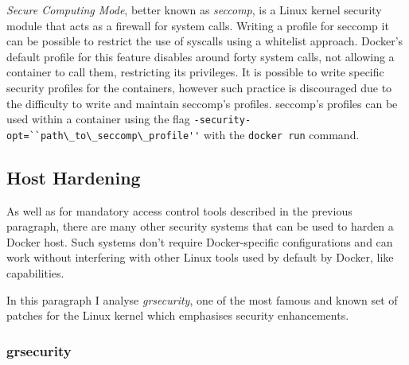 \documentclass[a4paper,12pt]{article}
\newcommand{\code}[1]{\lstinline|#1|}
\begin{document}
\textit{Secure Computing Mode}, better known as \textit{seccomp}, is a Linux kernel security
module that acts as a firewall for system calls. Writing a profile for seccomp
it can be possible to restrict the use of syscalls using a whitelist approach.
Docker's default profile for this feature disables around forty system calls,
not allowing a container to call them, restricting its privileges. It is
possible to write specific security profiles for the containers, however such
practice is discouraged due to the difficulty to write and maintain seccomp's
profiles. seccomp's profiles can be used within a container using the flag
\code{-security-opt=``path\_to\_seccomp\_profile''} with the \code{docker run} command.

\subsection{Host Hardening}

As well as for mandatory access control tools described in the previous
paragraph, there are many other security systems that can be used to harden a
Docker host. Such systems don't require Docker-specific configurations and can
work without interfering with other Linux tools used by default by Docker, like
capabilities. \par In this paragraph I analyse \textit{grsecurity}, one of the
most famous and known set of  patches for the Linux kernel which emphasises
security enhancements.  

\subsubsection{grsecurity}
\end{document}

